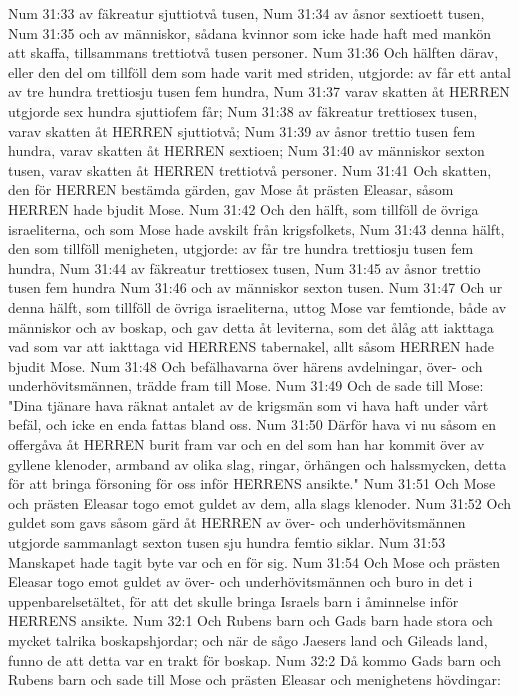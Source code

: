 Num 31:33  av fäkreatur sjuttiotvå tusen,
Num 31:34  av åsnor sextioett tusen,
Num 31:35  och av människor, sådana kvinnor som icke hade haft med mankön att skaffa, tillsammans trettiotvå tusen personer.
Num 31:36  Och hälften därav, eller den del om tillföll dem som hade varit med striden, utgjorde: av får ett antal av tre hundra trettiosju tusen fem hundra,
Num 31:37  varav skatten åt HERREN utgjorde sex hundra sjuttiofem får;
Num 31:38  av fäkreatur trettiosex tusen, varav skatten åt HERREN sjuttiotvå;
Num 31:39  av åsnor trettio tusen fem hundra, varav skatten åt HERREN sextioen;
Num 31:40  av människor sexton tusen, varav skatten åt HERREN trettiotvå personer.
Num 31:41  Och skatten, den för HERREN bestämda gärden, gav Mose åt prästen Eleasar, såsom HERREN hade bjudit Mose.
Num 31:42  Och den hälft, som tillföll de övriga israeliterna, och som Mose hade avskilt från krigsfolkets,
Num 31:43  denna hälft, den som tillföll menigheten, utgjorde: av får tre hundra trettiosju tusen fem hundra,
Num 31:44  av fäkreatur trettiosex tusen,
Num 31:45  av åsnor trettio tusen fem hundra
Num 31:46  och av människor sexton tusen.
Num 31:47  Och ur denna hälft, som tillföll de övriga israeliterna, uttog Mose var femtionde, både av människor och av boskap, och gav detta åt leviterna, som det ålåg att iakttaga vad som var att iakttaga vid HERRENS tabernakel, allt såsom HERREN hade bjudit Mose.
Num 31:48  Och befälhavarna över härens avdelningar, över- och underhövitsmännen, trädde fram till Mose.
Num 31:49  Och de sade till Mose: "Dina tjänare hava räknat antalet av de krigsmän som vi hava haft under vårt befäl, och icke en enda fattas bland oss.
Num 31:50  Därför hava vi nu såsom en offergåva åt HERREN burit fram var och en del som han har kommit över av gyllene klenoder, armband av olika slag, ringar, örhängen och halssmycken, detta för att bringa försoning för oss inför HERRENS ansikte."
Num 31:51  Och Mose och prästen Eleasar togo emot guldet av dem, alla slags klenoder.
Num 31:52  Och guldet som gavs såsom gärd åt HERREN av över- och underhövitsmännen utgjorde sammanlagt sexton tusen sju hundra femtio siklar.
Num 31:53  Manskapet hade tagit byte var och en för sig.
Num 31:54  Och Mose och prästen Eleasar togo emot guldet av över- och underhövitsmännen och buro in det i uppenbarelsetältet, för att det skulle bringa Israels barn i åminnelse inför HERRENS ansikte.
Num 32:1  Och Rubens barn och Gads barn hade stora och mycket talrika boskapshjordar; och när de sågo Jaesers land och Gileads land, funno de att detta var en trakt för boskap.
Num 32:2  Då kommo Gads barn och Rubens barn och sade till Mose och prästen Eleasar och menighetens hövdingar:
